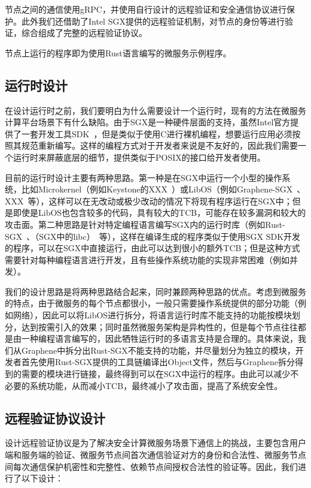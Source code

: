 节点之间的通信使用gRPC，并使用自行设计的远程验证和安全通信协议进行保护。此外我们还借助了Intel SGX提供的远程验证机制，对节点的身份等进行验证，综合组成了完整的远程验证协议。

节点上运行的程序即为使用Rust语言编写的微服务示例程序。

\subsection{运行时设计}

在设计运行时之前，我们要明白为什么需要设计一个运行时，现有的方法在微服务计算平台场景下有什么缺陷。由于SGX是一种硬件层面的支持，虽然Intel官方提供了一套开发工具SDK~\cite{}，但是类似于使用C进行裸机编程，想要运行应用必须按照其规范重新编写。这样的编程方式对于开发者来说是不友好的，因此我们需要一个运行时来屏蔽底层的细节，提供类似于POSIX的接口给开发者使用。

目前的运行时设计主要有两种思路。第一种是在SGX中运行一个小型的操作系统，比如Microkernel（例如Keystone的XXX~\cite{}）或LibOS（例如Graphene-SGX~\cite{}、XXX~\cite{}等），这样可以在无改动或极少改动的情况下将现有程序运行在SGX中；但是即使是LibOS也包含较多的代码，具有较大的TCB，可能存在较多漏洞和较大的攻击面。第二种思路是针对特定编程语言编写SGX内的运行时库（例如Rust-SGX~\cite{}、（SGX中的libc）~\cite{}等），这样在编译生成的程序类似于使用SGX SDK开发的程序，可以在SGX中直接运行，由此可以达到很小的额外TCB；但是这种方式需要针对每种编程语言进行开发，且有些操作系统功能的实现非常困难（例如并发）。

我们的设计思路是将两种思路结合起来，同时兼顾两种思路的优点。考虑到微服务的特点，由于微服务的每个节点都很小，一般只需要操作系统提供的部分功能（例如网络），因此可以将LibOS进行拆分，将语言运行时库不能支持的功能按模块划分，达到按需引入的效果；同时虽然微服务架构是异构性的，但是每个节点往往都是由一种编程语言编写的，因此牺牲运行时的多语言支持是合理的。具体来说，我们从Graphene中拆分出Rust-SGX不能支持的功能，并尽量划分为独立的模块，开发者首先使用Rust-SGX提供的工具链编译出Object文件，然后与Graphene拆分得到的需要的模块进行链接，最终得到可以在SGX中运行的程序。由此可以减少不必要的系统功能，从而减小TCB，最终减小了攻击面，提高了系统安全性。

\subsection{远程验证协议设计}

设计远程验证协议是为了解决安全计算微服务场景下通信上的挑战，主要包含用户端和服务端的验证、微服务节点间首次通信验证对方的身份和合法性、微服务节点间每次通信保护机密性和完整性、依赖节点间授权合法性的验证等。因此，我们进行了以下设计：

